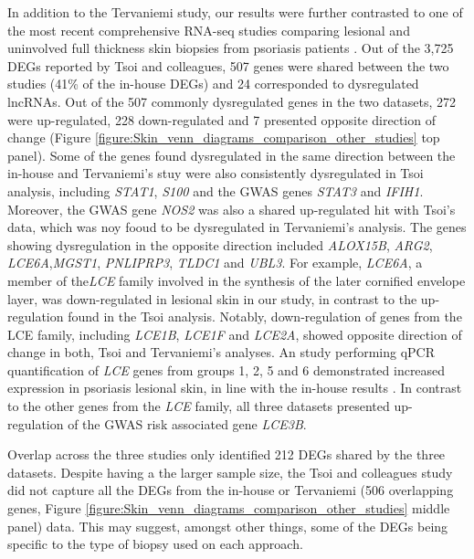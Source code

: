 In addition to the Tervaniemi study, our results were further contrasted to one of the most recent comprehensive RNA-seq studies comparing lesional and uninvolved full thickness skin biopsies from psoriasis patients \parencite{Tsoi2015}. Out of the 3,725 DEGs reported by Tsoi and colleagues, 507 genes were shared between the two studies (41\% of the in-house DEGs) and 24 corresponded to dysregulated lncRNAs. Out of the 507 commonly dysregulated genes in the two datasets, 272 were up-regulated, 228 down-regulated and 7 presented opposite direction of change (Figure \ref{figure:Skin_venn_diagrams_comparison_other_studies} top panel). Some of the genes found dysregulated in the same direction between the in-house and Tervaniemi's stuy were also consistently dysregulated in Tsoi analysis, including \textit{STAT1}, \textit{S100} and the GWAS genes \textit{STAT3} and \textit{IFIH1}. Moreover, the GWAS gene \textit{NOS2} was also a shared up-regulated hit with Tsoi's data, which was noy fooud to be dysregulated in Tervaniemi's analysis. The genes showing dysregulation in the opposite direction included \textit{ALOX15B},  \textit{ARG2}, \textit{LCE6A},\textit{MGST1}, \textit{PNLIPRP3}, \textit{TLDC1} and \textit{UBL3}. For example, \textit{LCE6A}, a member of the\textit{LCE} family involved in the synthesis of the later cornified envelope layer, was down-regulated in lesional skin in our study, in contrast to the up-regulation found in the Tsoi analysis. Notably, down-regulation of genes from the LCE family, including \textit{LCE1B}, \textit{LCE1F} and \textit{LCE2A}, showed opposite direction of change in both, Tsoi and Tervaniemi's analyses. An study performing qPCR quantification of \textit{LCE} genes from groups 1, 2, 5 and 6 demonstrated increased expression in psoriasis lesional skin, in line with the in-house results \parencite{Bergboer2011}. In contrast to the other genes from the \textit{LCE} family, all three datasets presented up-regulation of the GWAS risk associated gene \textit{LCE3B}. 

Overlap across the three studies only identified 212 DEGs shared by the three datasets. Despite having a the larger sample size, the Tsoi and colleagues study did not capture all the DEGs from the in-house or Tervaniemi (506 overlapping genes, Figure \ref{figure:Skin_venn_diagrams_comparison_other_studies} middle panel) data. This may suggest, amongst other things, some of the DEGs being specific to the type of biopsy used on each approach. 


